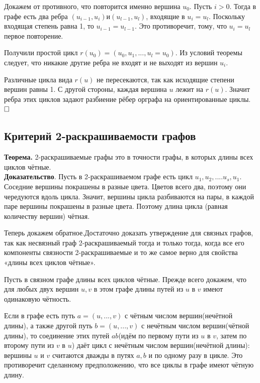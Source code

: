\documentclass[a4paper, 10pt]{article}
\begin{document}
Докажем от противного, что повторится именно вершина $u_0$. Пусть $i > 0$. Тогда в графе есть два ребра $(u_{i - 1}, u_i) и (u_{l - 1}, u_l)$, входящие в $u_i = u_l$. Поскольку входящая степень равна 1, то $u_{i - 1} = u_{l - 1}$. Это противоречит, тому, что $u_i = u_l$ первое повторение.

Получили простой цикл $r(u_0) = (u_0, u_1, ..., u_l = u_0)$. Из условий теоремы следует, что никакие другие ребра не входят и не выходят из вершин $u_i$.

Различные цикла вида $r(u)$ не пересекаются, так как исходящие степени вершин равны 1. С другой стороны, каждая вершина $u$ лежит на $r(u)$. Значит ребра этих циклов задают разбиение рёбер орграфа на ориентированные циклы. $\hfill \square$


\subsection{Критерий 2-раскрашиваемости графов}

\textbf{Теорема.} 2-раскрашиваемые графы это в точности графы, в которых длины всех циклов чётные. \\

\textbf{Доказательство}. Пусть в 2-раскрашиваемом графе есть цикл $u_1, u_2, .... u_s, u_1$. Соседние вершины покрашены в разные цвета. Цветов всего два, поэтому они чередуются вдоль цикла. Значит, вершины цикла разбиваются на пары, в каждой паре вершины покрашены в разные цвета. Поэтому длина цикла (равная количеству вершин) чётная.

Теперь докажем обратное.Достаточно доказать утверждение для связных графов, так как несвязный граф 2-раскрашиваемый тогда и только тогда, когда все его компоненты связности 2-раскрашиваемые и то же самое верно для свойства «длины всех циклов чётные».

Пусть в связном графе длины всех циклов чётные. Прежде всего докажем, что для любых двух вершин $u, v$ в этом графе длины путей из $u$ в $v$ имеют одинаковую чётность.

Если в графе есть путь $a = (u, ..., v)$ с чётным числом вершин(нечётной длины), а также другой путь $b = (u, ..., v)$ с нечётным числом вершин(чётной длины), то соединение этих путей $ab$(идём по первому пути из $u$ в $v$, затем по второму пути из $v$ в $u$) даёт цикл с нечётным числом вершин(нечётной длины): вершины $u$ и $v$ считаются дважды в путях $a, b$ и по одному разу в цикле. Это противоречит сделанному предположению, что все циклы в графе имеют чётную длину.
\end{document}

